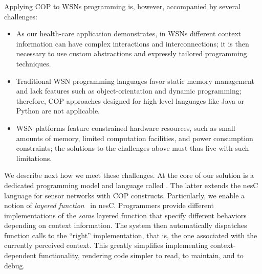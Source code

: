 Applying COP to WSNs programming is, however, accompanied by several challenges:
\begin{itemize}\compresslist
\item As our health-care application demonstrates, in WSNs
  different context information can have complex interactions and
  interconnections; it is then necessary to use custom abstractions
  and expressly tailored programming techniques.
\item Traditional WSN programming languages favor static memory
  management and lack features such as object-orientation and dynamic
  programming; therefore, COP approaches designed for high-level
  languages like Java or Python are not applicable.
\item WSN platforms feature constrained hardware resources, such as
  small amounts of memory, limited computation facilities, and power
  consumption constraints; the solutions to the challenges above must
  thus live with such limitations.
\end{itemize}

We describe next how we meet these challenges. At the core of our
solution is a dedicated programming model and language called
{}. The latter extends the nesC~\cite{gay03:nesc}
language for sensor networks with COP constructs. Particularly, we
enable a notion of \emph{layered function}~\cite{hirschfeld08} in
nesC. Programmers provide different implementations of the \emph{same}
layered function that specify different behaviors depending on context
information. The system then automatically dispatches function calls
to the ``right'' implementation, that is, the one associated with the
currently perceived context. This greatly simplifies implementing
context-dependent functionality, rendering code
simpler to read, to maintain, and to debug.


